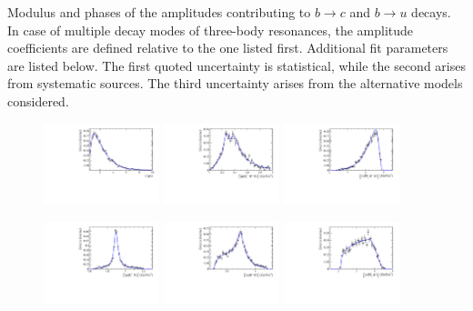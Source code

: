 \begin{table}[h]
\centering
\caption{
\small
Modulus and phases of the amplitudes contributing to $b \to c$ and $b \to u$ decays.
In case of multiple decay modes of three-body resonances, the amplitude coefficients are defined relative to the one listed first.
Additional fit parameters are listed below.
The first quoted uncertainty is statistical, while the second arises from systematic sources. 
The third uncertainty arises from the alternative models considered.
}
\resizebox{\linewidth}{!}{
	\renewcommand{\arraystretch}{1.5}
	
}
\label{tab:fullResult}
\end{table}

\clearpage

\begin{figure}[h]
	\centering
		\includegraphics[width=0.3\textwidth, height = !]{figs/fullFit/signal/h_t.pdf} 
		\includegraphics[width=0.3\textwidth, height = !]{figs/fullFit/signal/m_Kpipi.pdf} 
		\includegraphics[width=0.3\textwidth, height = !]{figs/fullFit/signal/m_Dspipi.pdf} 

		\includegraphics[width=0.3\textwidth, height = !]{figs/fullFit/signal/m_Kpi.pdf} 
		\includegraphics[width=0.3\textwidth, height = !]{figs/fullFit/signal/m_pipi.pdf} 
		\includegraphics[width=0.3\textwidth, height = !]{figs/fullFit/signal/m_Dspi.pdf} 


\end{figure}
